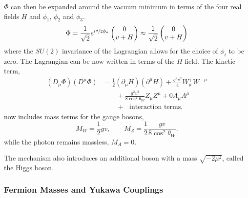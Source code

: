 $\Phi$ can then be expanded around the vacuum minimum in terms of the four real
fields $H$ and $\phi_1$, $\phi_2$ and $\phi_3$.
\begin{equation}
\label{eq:phi}
\Phi = 
\frac{1}{\sqrt{2}}
e^{i\nicefrac{\sigma}{2}\phi_a}
\left(\begin{matrix}0\\v+H\end{matrix}\right)
\approx 
\frac{1}{\sqrt{2}}
\left(\begin{matrix}0\\v+H\end{matrix}\right)
\end{equation}
where the $SU(2)$ invariance of the Lagrangian allows for the choice of $\phi_i$
to be zero\cite{halzen1984quarks,ral}.
The Lagrangian can be now written in terms of the $H$ field. The kinetic
term,\cite{ral}
\begin{align}
\left(D_{\mu}\Phi\right) \left(D^{\mu}\Phi\right) 
&= \frac{1}{2} \left(\partial_{\mu}H\right) \left(\partial^{\mu}H\right) 
         + \frac{g^{2}v^{2}}{4} W_{\mu}^{+} W^{-~\mu} \nonumber \\
&\qquad{}+ \frac{g^{2}v^{2}}{8 \cos^{2}\theta_{W}} Z_{\mu} Z^{\mu} + 0 A_{\mu} A^{\mu} \nonumber \\
&\qquad{}+ \text{~ interaction terms},
\end{align}
now includes mass terms for the gauge bosons,
\begin{equation}
M_{W} = \frac{1}{2}gv, \qquad 
M_{Z} = \frac{1}{2}\frac{gv}{8\cos^{2}\theta_{W}} .
\end{equation}
while the photon remains massless, $M_{A}=0$.

The mechanism also introduces an additional boson with a mass
$\sqrt{-2\mu^{2}}$, called the Higgs boson.

\subsubsection{Fermion Masses and Yukawa Couplings}

